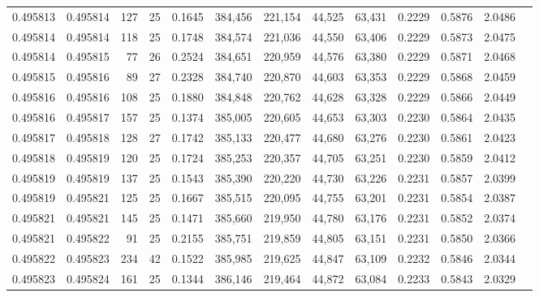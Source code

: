 \begin{tabular}{rrrrrrrrrrrrr}
0.495813 & 0.495814 & 127 &  25 &                                     0.1645 & 384,456 & 221,154 &  44,525 &  63,431 & 0.2229 & 0.5876 & 2.0486 \\
0.495814 & 0.495814 & 118 &  25 &                                     0.1748 & 384,574 & 221,036 &  44,550 &  63,406 & 0.2229 & 0.5873 & 2.0475 \\
0.495814 & 0.495815 &  77 &  26 &                                     0.2524 & 384,651 & 220,959 &  44,576 &  63,380 & 0.2229 & 0.5871 & 2.0468 \\
0.495815 & 0.495816 &  89 &  27 &                                     0.2328 & 384,740 & 220,870 &  44,603 &  63,353 & 0.2229 & 0.5868 & 2.0459 \\
0.495816 & 0.495816 & 108 &  25 &                                     0.1880 & 384,848 & 220,762 &  44,628 &  63,328 & 0.2229 & 0.5866 & 2.0449 \\
0.495816 & 0.495817 & 157 &  25 &                                     0.1374 & 385,005 & 220,605 &  44,653 &  63,303 & 0.2230 & 0.5864 & 2.0435 \\
0.495817 & 0.495818 & 128 &  27 &                                     0.1742 & 385,133 & 220,477 &  44,680 &  63,276 & 0.2230 & 0.5861 & 2.0423 \\
0.495818 & 0.495819 & 120 &  25 &                                     0.1724 & 385,253 & 220,357 &  44,705 &  63,251 & 0.2230 & 0.5859 & 2.0412 \\
0.495819 & 0.495819 & 137 &  25 &                                     0.1543 & 385,390 & 220,220 &  44,730 &  63,226 & 0.2231 & 0.5857 & 2.0399 \\
0.495819 & 0.495821 & 125 &  25 &                                     0.1667 & 385,515 & 220,095 &  44,755 &  63,201 & 0.2231 & 0.5854 & 2.0387 \\
0.495821 & 0.495821 & 145 &  25 &                                     0.1471 & 385,660 & 219,950 &  44,780 &  63,176 & 0.2231 & 0.5852 & 2.0374 \\
0.495821 & 0.495822 &  91 &  25 &                                     0.2155 & 385,751 & 219,859 &  44,805 &  63,151 & 0.2231 & 0.5850 & 2.0366 \\
0.495822 & 0.495823 & 234 &  42 &                                     0.1522 & 385,985 & 219,625 &  44,847 &  63,109 & 0.2232 & 0.5846 & 2.0344 \\
0.495823 & 0.495824 & 161 &  25 &                                     0.1344 & 386,146 & 219,464 &  44,872 &  63,084 & 0.2233 & 0.5843 & 2.0329 \\

\end{tabular}
